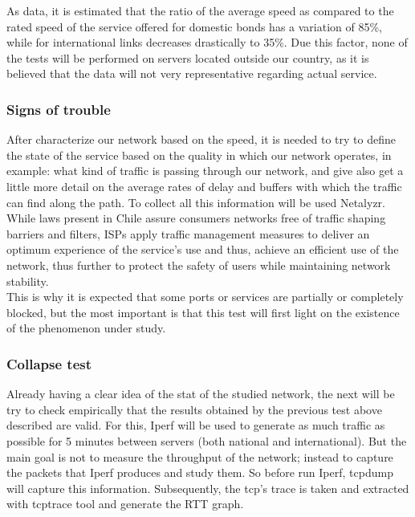 As data, it is estimated that the ratio of the average speed as compared to the
rated speed of the service offered for domestic bonds has a variation of 85\%,
while for international links decreases drastically to 35\%\cite{modcompqos}.
Due this factor, none of the tests will be performed on servers located outside
our country, as it is believed that the data will not very representative
regarding actual service.\\

\subsubsection{Signs of trouble} 
After characterize our network based on the
speed, it is needed to try to define the state of the service based on the
quality in which our network operates, in example: what kind of traffic is
passing through our network, and give also get a little more detail on the
average rates of delay and buffers with which the traffic can find along the
path. To collect all this information will be used Netalyzr. \\

While laws present in Chile assure consumers networks free of traffic shaping
barriers and filters, ISPs apply traffic management
measures\cite{shapevtr}\cite{shapemov} to deliver an optimum experience of the
service's use and thus, achieve an efficient use of the network, thus further to
protect the safety of users while maintaining network stability.\\

This is why it is expected that some ports or services are partially or
completely blocked, but the most important is that this test will first light on
the existence of the phenomenon under study.\\

\subsubsection{Collapse test} 
Already having a clear idea of the stat of the studied network, the next will be
try to check empirically that the results obtained by the previous test above
described are valid. For this, Iperf will be used to generate as much traffic as
possible for 5 minutes between servers (both national and international). But
the main goal is not to measure the throughput of the network; instead to
capture the packets that Iperf produces and study them. So before run Iperf,
tcpdump will capture this information. Subsequently, the tcp's trace is taken
and extracted with tcptrace tool and generate the RTT graph.\\

